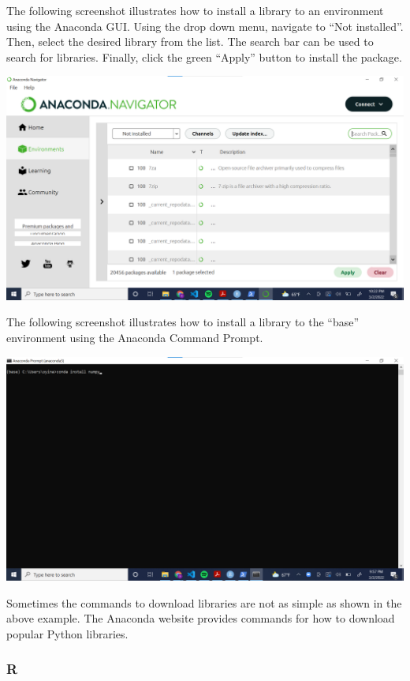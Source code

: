 \documentclass[
]{book}
\begin{document}
The following screenshot illustrates how to install a library to an environment using the Anaconda GUI. Using the drop down menu, navigate to ``Not installed''. Then, select the desired library from the list. The search bar can be used to search for libraries. Finally, click the green ``Apply'' button to install the package.

\includegraphics[width=26.67in]{images/anaconda_gui_install}

The following screenshot illustrates how to install a library to the ``base'' environment using the Anaconda Command Prompt.

\includegraphics[width=26.67in]{images/anaconda_command_install}

Sometimes the commands to download libraries are not as simple as shown in the above example. The Anaconda website provides commands for how to download popular Python libraries.

\hypertarget{r-3}{%
\subsubsection*{R}\label{r-3}}
\end{document}
